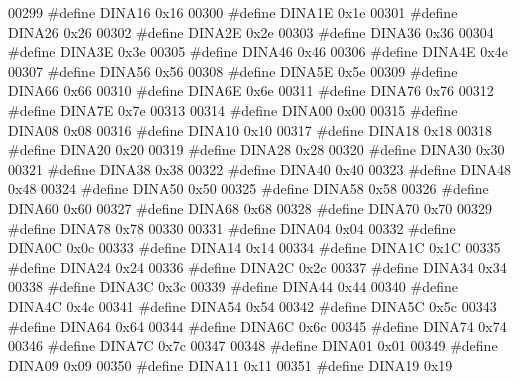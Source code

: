 \begin{DoxyCode}
00299 \textcolor{preprocessor}{#define DINA16 0x16}
00300 \textcolor{preprocessor}{#define DINA1E 0x1e}
00301 \textcolor{preprocessor}{#define DINA26 0x26}
00302 \textcolor{preprocessor}{#define DINA2E 0x2e}
00303 \textcolor{preprocessor}{#define DINA36 0x36}
00304 \textcolor{preprocessor}{#define DINA3E 0x3e}
00305 \textcolor{preprocessor}{#define DINA46 0x46}
00306 \textcolor{preprocessor}{#define DINA4E 0x4e}
00307 \textcolor{preprocessor}{#define DINA56 0x56}
00308 \textcolor{preprocessor}{#define DINA5E 0x5e}
00309 \textcolor{preprocessor}{#define DINA66 0x66}
00310 \textcolor{preprocessor}{#define DINA6E 0x6e}
00311 \textcolor{preprocessor}{#define DINA76 0x76}
00312 \textcolor{preprocessor}{#define DINA7E 0x7e}
00313 
00314 \textcolor{preprocessor}{#define DINA00 0x00}
00315 \textcolor{preprocessor}{#define DINA08 0x08}
00316 \textcolor{preprocessor}{#define DINA10 0x10}
00317 \textcolor{preprocessor}{#define DINA18 0x18}
00318 \textcolor{preprocessor}{#define DINA20 0x20}
00319 \textcolor{preprocessor}{#define DINA28 0x28}
00320 \textcolor{preprocessor}{#define DINA30 0x30}
00321 \textcolor{preprocessor}{#define DINA38 0x38}
00322 \textcolor{preprocessor}{#define DINA40 0x40}
00323 \textcolor{preprocessor}{#define DINA48 0x48}
00324 \textcolor{preprocessor}{#define DINA50 0x50}
00325 \textcolor{preprocessor}{#define DINA58 0x58}
00326 \textcolor{preprocessor}{#define DINA60 0x60}
00327 \textcolor{preprocessor}{#define DINA68 0x68}
00328 \textcolor{preprocessor}{#define DINA70 0x70}
00329 \textcolor{preprocessor}{#define DINA78 0x78}
00330 
00331 \textcolor{preprocessor}{#define DINA04 0x04}
00332 \textcolor{preprocessor}{#define DINA0C 0x0c}
00333 \textcolor{preprocessor}{#define DINA14 0x14}
00334 \textcolor{preprocessor}{#define DINA1C 0x1C}
00335 \textcolor{preprocessor}{#define DINA24 0x24}
00336 \textcolor{preprocessor}{#define DINA2C 0x2c}
00337 \textcolor{preprocessor}{#define DINA34 0x34}
00338 \textcolor{preprocessor}{#define DINA3C 0x3c}
00339 \textcolor{preprocessor}{#define DINA44 0x44}
00340 \textcolor{preprocessor}{#define DINA4C 0x4c}
00341 \textcolor{preprocessor}{#define DINA54 0x54}
00342 \textcolor{preprocessor}{#define DINA5C 0x5c}
00343 \textcolor{preprocessor}{#define DINA64 0x64}
00344 \textcolor{preprocessor}{#define DINA6C 0x6c}
00345 \textcolor{preprocessor}{#define DINA74 0x74}
00346 \textcolor{preprocessor}{#define DINA7C 0x7c}
00347 
00348 \textcolor{preprocessor}{#define DINA01 0x01}
00349 \textcolor{preprocessor}{#define DINA09 0x09}
00350 \textcolor{preprocessor}{#define DINA11 0x11}
00351 \textcolor{preprocessor}{#define DINA19 0x19}

\end{DoxyCode}
